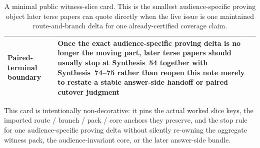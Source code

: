 \documentclass[11pt]{article}
\begin{document}
\begin{table}[t]
\begin{tabularx}{\linewidth}{@{}lX@{}}
Paired-terminal boundary & Once the exact audience-specific proving delta is no longer the moving part, later terse papers should usually stop at Synthesis~54 together with Synthesis~74--75 rather than reopen this note merely to restate a stable answer-side handoff or paired cutover judgment \\
\bottomrule
\end{tabularx}
\caption{A minimal public witness-slice card. This is the smallest audience-specific proving object later terse papers can quote directly when the live issue is one maintained route-and-branch delta for one already-certified coverage claim.}
\label{tab:minimal-public-witness-slice-card}
\end{table}

This card is intentionally non-decorative: it pins the actual worked slice keys, the imported route / branch / pack / core anchors they preserve, and the stop rule for one audience-specific proving delta without silently re-owning the aggregate witness pack, the audience-invariant core, or the later answer-side bundle.\cite{series:workedexample}
\end{document}
